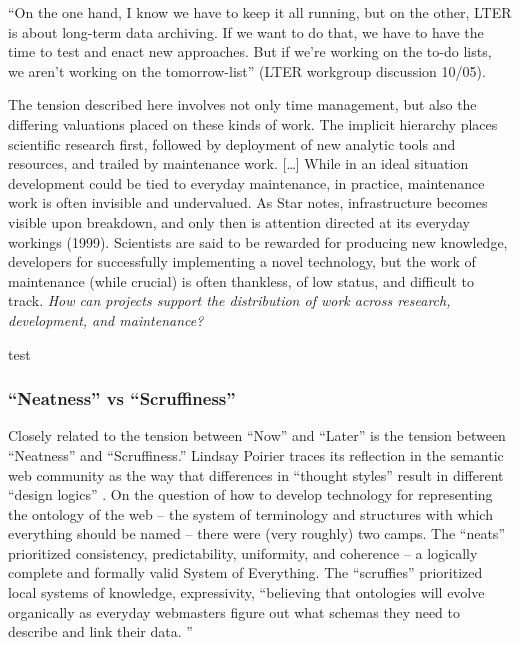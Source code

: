 \documentclass[11pt]{article}
\begin{document}
\begin{multicols}{2}
\begin{leftbar}
``On the one hand, I know we have to keep it all running, but on the
other, LTER is about long-term data archiving. If we want to do that, we
have to have the time to test and enact new approaches. But if we're
working on the to-do lists, we aren't working on the tomorrow-list''
(LTER workgroup discussion 10/05).

The tension described here involves not only time management, but also
the differing valuations placed on these kinds of work. The implicit
hierarchy places scientific research first, followed by deployment of
new analytic tools and resources, and trailed by maintenance work.
{[}\ldots{]} While in an ideal situation development could be tied to
everyday maintenance, in practice, maintenance work is often invisible
and undervalued. As Star notes, infrastructure becomes visible upon
breakdown, and only then is attention directed at its everyday workings
(1999). Scientists are said to be rewarded for producing new knowledge,
developers for successfully implementing a novel technology, but the
work of maintenance (while crucial) is often thankless, of low status,
and difficult to track. \emph{How can projects support the distribution
of work across research, development, and maintenance?} \cite{ribesLongNowTechnology2009} 
\end{leftbar}

\cite{gawerBridgingDifferingPerspectives2014} 

test

\hypertarget{neatness-vs-scruffiness}{%
\subsubsection{``Neatness'' vs
``Scruffiness''}\label{neatness-vs-scruffiness}}

Closely related to the tension between ``Now'' and ``Later'' is the
tension between ``Neatness'' and ``Scruffiness.'' Lindsay Poirier traces
its reflection in the semantic web community as the way that differences
in ``thought styles'' result in different ``design logics'' \cite{poirierTurnScruffyEthnographic2017} . On the question of how to
develop technology for representing the ontology of the web -- the
system of terminology and structures with which everything should be
named -- there were (very roughly) two camps. The ``neats'' prioritized
consistency, predictability, uniformity, and coherence -- a logically
complete and formally valid System of Everything. The ``scruffies''
prioritized local systems of knowledge, expressivity, ``believing that
ontologies will evolve organically as everyday webmasters figure out
what schemas they need to describe and link their data. \cite{poirierTurnScruffyEthnographic2017} ''


\end{multicols}
\end{document}
